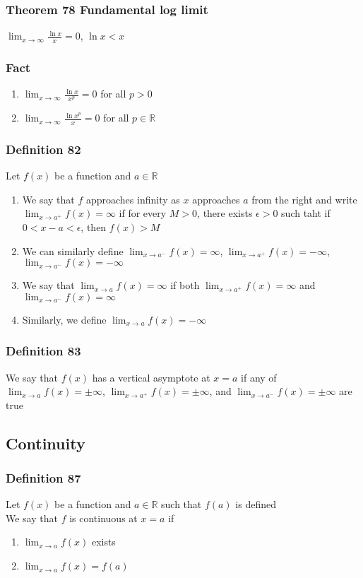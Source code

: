 \documentclass[12pt, letterpaper]{article}
\begin{document}
\subsubsection*{Theorem 78 Fundamental log limit}
$\displaystyle\lim_{x\to \infty} \frac{\ln x}{x} = 0$, $\ln x < x$
\subsubsection*{Fact}
\begin{enumerate}
    \item $\displaystyle\lim_{x\to \infty} \frac{\ln x}{x^p} = 0$ for all $p>0$
    \item $\displaystyle\lim_{x\to \infty} \frac{\ln x^p}{x} = 0$ for all $p \in \mathbb{R}$
\end{enumerate}
\subsubsection*{Definition 82}
Let $f(x)$ be a function and $a\in\mathbb{R}$
\begin{enumerate}
    \item We say that $f$ approaches infinity as $x$ approaches $a$ from the right and write $\displaystyle\lim_{x\to a^+} f(x) = \infty$ if for every $M>0$, there exists $\epsilon>0$ such taht if $0<x-a<\epsilon$, then $f(x) > M$
    \item We can similarly define $\displaystyle\lim_{x\to a^-} f(x) = \infty$, $\displaystyle\lim_{x\to a^+} f(x) = -\infty$, $\displaystyle\lim_{x\to a^-} f(x) = -\infty$
    \item We say that $\displaystyle\lim_{x\to a} f(x) = \infty$ if both $\displaystyle\lim_{x\to a^+} f(x) = \infty$ and $\displaystyle\lim_{x\to a^-} f(x) = \infty$
    \item Similarly, we define $\displaystyle\lim_{x\to a} f(x) = -\infty$
\end{enumerate}
\subsubsection*{Definition 83}
We say that $f(x)$ has a vertical asymptote at $x=a$ if any of $\displaystyle\lim_{x\to a} f(x) = \pm\infty$, 
$\displaystyle\lim_{x\to a^+} f(x) = \pm\infty$, and $\displaystyle\lim_{x\to a^-} f(x) = \pm\infty$ are true
\subsection{Continuity}
\subsubsection*{Definition 87}
Let $f(x)$ be a function and $a\in\mathbb{R}$ such that $f(a)$ is defined \\
We say that $f$ is continuous at $x=a$ if 
\begin{enumerate}
    \item $\displaystyle\lim_{x\to a} f(x)$ exists
    \item $\displaystyle\lim_{x\to a} f(x) = f(a)$
\end{enumerate}
\end{document}
